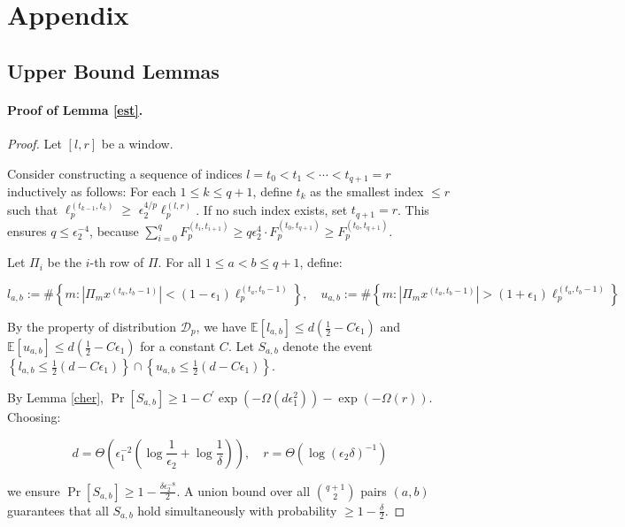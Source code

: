 \documentclass{article}
\theoremstyle{plain}
\begin{document}

\newpage
\section{Appendix}
\subsection{Upper Bound Lemmas}
\paragraph{Proof of Lemma \ref{est}.}
\begin{proof}

Let $[l, r]$ be a window.


    Consider constructing a sequence of indices $l=t_0<t_1<\cdots<t_{q+1}=r$ inductively as follows: For each $1 \leq k \leq q+1$, define $t_k$ as the smallest index $\leq r$ such that $\ell_p^{\left(t_{k-1}, t_k\right)} \geq$ $\epsilon_2^{4 / p} \ell_p^{\left(l, r\right)}$. If no such index exists, set $t_{q+1}=r$. This ensures $q \leq \epsilon_2^{-4}$, because $\sum_{i =0} ^ q F_p ^ {(t_{i}, t_{i+1})} \ge q\epsilon_2 ^ 4 \cdot F_p ^ {(t_0, t_{q+1})} \ge F_p ^ {(t_0, t_{q+1})}$. 

Let $\Pi_i$ be the $i$-th row of $\Pi$. For all $1 \leq a<b \leq q+1$, define:

$$
l_{a, b}:=\#\left\{m: |\Pi_mx ^ {(t_a, t_b-1)}|<\left(1-\epsilon_1\right) \ell_p^{\left(t_a, t_b-1\right)}\right\}, \quad u_{a, b}:=\#\left\{m:|\Pi_mx ^ {(t_a, t_b-1)}|>\left(1+\epsilon_1\right) \ell_p^{\left(t_a, t_b-1\right)}\right\}
$$


By the property of distribution $\mathcal{D}_p$, we have $\mathbb{E}\left[l_{a, b}\right] \leq d\left(\frac{1}{2}-C \epsilon_1\right)$ and $\mathbb{E}\left[u_{a, b}\right] \leq d\left(\frac{1}{2}-C \epsilon_1\right)$ for a constant $C$. Let $S_{a, b}$ denote the event $\left\{l_{a, b} \leq \frac{1}{2}\left(d-C \epsilon_1\right)\right\} \cap\left\{u_{a, b} \leq \frac{1}{2}\left(d-C \epsilon_1\right)\right\}$.

By Lemma \ref{cher}, $\operatorname{Pr}\left[S_{a, b}\right] \geq 1-C^{\prime} \exp \left(-\Omega\left(d \epsilon_1^2\right)\right)-\exp (-\Omega(r))$. Choosing:

$$
d=\Theta\left(\epsilon_1^{-2}\left(\log \frac{1}{\epsilon_2}+\log \frac{1}{\delta}\right)\right), \quad r=\Theta\left(\log \left(\epsilon_2 \delta\right)^{-1}\right)
$$

we ensure $\operatorname{Pr}\left[S_{a, b}\right] \geq 1-\frac{\delta \epsilon_2^{-8}}{2}$. A union bound over all $\binom{q+1}{2}$ pairs $(a, b)$ guarantees that all $S_{a, b}$ hold simultaneously with probability $\geq 1-\frac{\delta}{2}$.


\end{proof}
\end{document}
